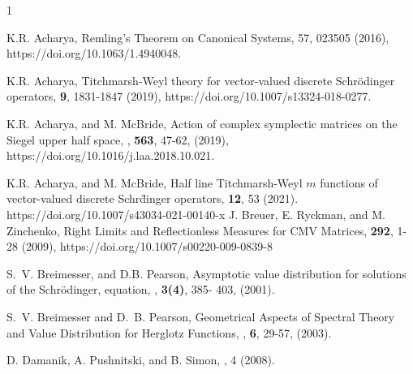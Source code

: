 \documentclass[reqno]{amsart}
\numberwithin{equation}{section}
\begin{document}
\begin{thebibliography}{1}




































K.R. Acharya,
\newblock Remling's Theorem on Canonical Systems, 
57, 023505 (2016),
https://doi.org/10.1063/1.4940048.


  K.R. Acharya,  
\newblock Titchmarsh-Weyl theory for vector-valued discrete Schr\"odinger operators,
 {\bf 9}, 1831-1847 (2019), https://doi.org/10.1007/s13324-018-0277.

  K.R. Acharya, and M. McBride,
\newblock Action of complex symplectic matrices on the Siegel upper half space,
, {\bf563}, 47-62, (2019),
https://doi.org/10.1016/j.laa.2018.10.021.

  K.R. Acharya, and M. McBride,
\newblock Half line Titchmarsh-Weyl $m$ functions of vector-valued discrete Schr\"dinger operators,
 {\bf 12}, 53 (2021). https://doi.org/10.1007/s43034-021-00140-x
  J. Breuer,  E. Ryckman, and M. Zinchenko,
\newblock Right Limits and Reflectionless Measures for CMV Matrices,
 {\bf 292}, 1-28 (2009), https://doi.org/10.1007/s00220-009-0839-8

S.~V. Breimesser, and D.B. Pearson,
\newblock Asymptotic value distribution for solutions of the {S}chr\"odinger,
  equation,
, {\bf 3(4)}, 385- 403, (2001).

S.~V. Breimesser and D.~B. Pearson,
\newblock Geometrical Aspects of Spectral Theory and
Value Distribution for Herglotz Functions,
, {\bf 6}, 29-57, (2003).

 D. Damanik, A. Pushnitski, and B. Simon,
, 
 4 (2008).



\end{thebibliography}
\end{document}
